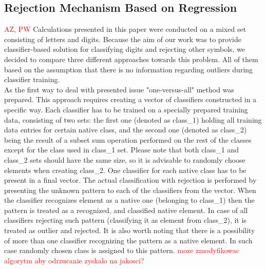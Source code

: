 \documentclass{llncs}
\begin{document}
\subsection{Rejection Mechanism Based on Regression}
\textcolor{red} {AZ, PW}
Calculations presented in this paper were conducted on a mixed set consisting of letters and digits. Because the aim of our work was to provide classifier-based solution for classifying digits and rejecting other symbols, we decided to compare three different approaches towards this problem. All of them based on the assumption that there is no information regarding outliers during classifier training. \\

As the first way to deal with presented issue "one-versus-all" method was prepared. This approach requires creating a vector of classifiers constructed in a specific way. Each classifier has to be trained on a specially prepared training data, consisting of two sets: the first one (denoted as class\_1) holding all training data entries for certain native class, and the second one (denoted as class\_2) being the result of a subset sum operation performed on the rest of the classes except for the class used in class\_1 set. Please note that both class\_1 and class\_2 sets should have the same size, so it is advisable to randomly choose elements when creating class\_2. One classifier for each native class has to be present in a final vector. The actual classification with rejection is performed by presenting the unknown pattern to each of the classifiers from the vector. When the classifier recognizes element as a native one (belonging to class\_1) then the pattern is treated as a recognized, and classified native element. In case of all classifiers rejecting such pattern (classifying it as element from class\_2), it is treated as outlier and rejected. It is also worth noting that there is a possibility of more than one classifier recognizing the pattern as a native element. In such case randomly chosen class is assigned to this pattern. \textcolor{red}{moze zmodyfikowac algorytm aby odrzucanie zyskalo na jakosci?} \\
\end{document}
